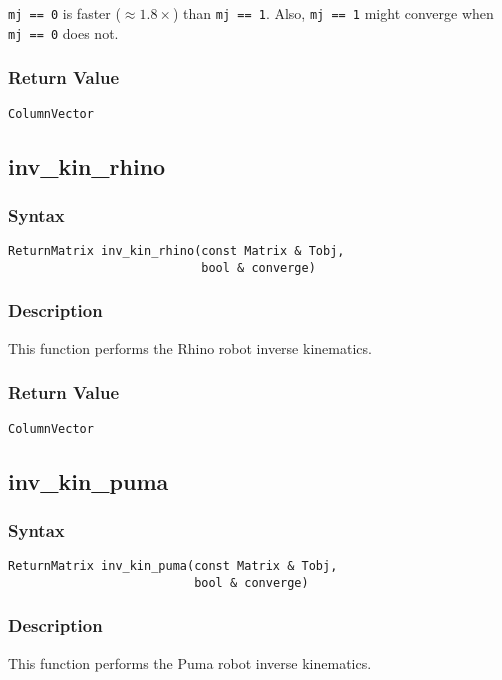 \documentclass[11pt,fleqn,letterpaper]{report}
\begin{document}
 {\tt mj == 0} is faster ($\approx 1.8\times$) than {\tt mj == 1}. 
Also, {\tt mj == 1} might converge when {\tt mj == 0} does not.

\subsubsection*{Return Value}

{\tt ColumnVector}

\newpage

\subsection*{inv\_kin\_rhino}
\subsubsection*{Syntax}
\begin{verbatim}
ReturnMatrix inv_kin_rhino(const Matrix & Tobj, 
                           bool & converge)
\end{verbatim}
\subsubsection*{Description}
This function performs the Rhino robot inverse kinematics.

\subsubsection*{Return Value}

{\tt ColumnVector}

\newpage

\subsection*{inv\_kin\_puma}
\subsubsection*{Syntax}
\begin{verbatim}
ReturnMatrix inv_kin_puma(const Matrix & Tobj, 
                          bool & converge)
\end{verbatim}
\subsubsection*{Description}
This function performs the Puma robot inverse kinematics.
\end{document}
